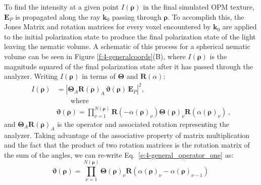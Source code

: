 To find the intensity at a given point $I(\bm{\rho})$ in the final simulated OPM texture, $\mathbf{E}_P$ is propagated along the ray $\mathbf{k}_0$ passing through $\bm{\rho}$.
To accomplish this, the Jones Matrix and rotation matrices for every voxel encountered by $\mathbf{k}_0$ are applied to the initial polarization state to produce the final polarization state of the light leaving the nematic volume.
A schematic of this process for a spherical nematic volume can be seen in Figure \ref{f:4-generalcoords}(B), where $I(\bm{\rho})$ is the magnitude squared of the final polarization state after it has passed through the analyzer.
Writing $I(\bm{\rho})$ in terms of $\bm{\Theta}$ and $\mathbf{R}(\alpha)$:
\begin{align}
I(\bm{\rho}) &= |\bm{\Theta}_A \mathbf{R}(\bm{\rho})_A\, \bm{\vartheta}(\bm{\rho}) \, \mathbf{E}_P|^2, \, \label{e:4-Intensity} \\
 & \quad\quad\textrm{where}\\
        & \bm{\vartheta}(\bm{\rho}) =  \prod\limits_{\nu = 1}^{N(\bm{\rho})}\!\mathbf{R}(-\alpha(\bm{\rho})_{\nu}) \bm{\Theta}(\bm{\rho})_{\nu} \mathbf{R}(\alpha(\bm{\rho})_{\nu})\,, \label{e:4-general_operator_one}
\end{align}
and $\bm{\Theta}_A \mathbf{R}(\bm{\rho})_A$ is the operator and associated rotation representing the analyzer.
Taking advantage of the associative property of matrix multiplication and the fact that the product of two rotation matrices is the rotation matrix of the sum of the angles, we can re-write Eq.~\ref{e:4-general_operator_one} as:
\begin{equation}
\bm{\vartheta}(\bm{\rho}) =  \prod\limits_{\nu = 1}^{N(\bm{\rho})}\!\bm{\Theta}(\bm{\rho})_{\nu} \mathbf{R}(\alpha(\bm{\rho})_{\nu}-\alpha(\bm{\rho})_{\nu-1})\,
\end{equation}

